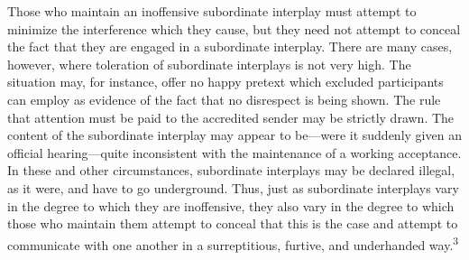 \documentclass[openany,nobib]{tufte-book}
\begin{document}
Those who maintain an inoffensive subordinate interplay must attempt to
minimize the interference which they cause, but they need not attempt to
conceal the fact that they are engaged in a subordinate interplay. There
are many cases, however, where toleration of subordinate interplays is
not very high. The situation may, for instance, offer no happy pretext
which excluded participants can employ as evidence of the fact that no
disrespect is being shown. The rule that attention must be paid to the
accredited sender may be strictly drawn. The content of the subordinate
interplay may appear to be---were it suddenly given an official
hearing---quite inconsistent with the maintenance of a working
acceptance. In these and other circumstances, subordinate interplays may
be declared illegal, as it were, and have to go underground. Thus, just
as subordinate interplays vary in the degree to which they are
inoffensive, they also vary in the degree to which those who maintain
them attempt to conceal that this is the case and attempt to communicate
with one another in a surreptitious, furtive, and underhanded
way.\textsuperscript{3}
\end{document}
